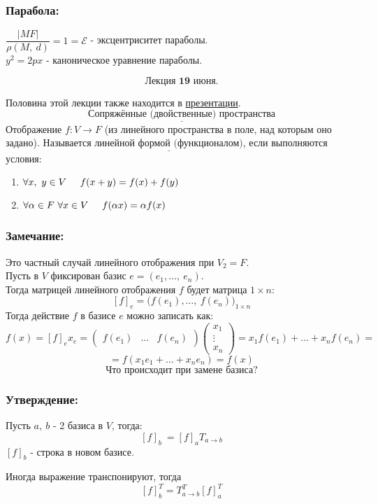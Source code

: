 \documentclass[12pt, letterpaper, twoside]{article}
\newcommand{\Underl}[1]{$\underline{\text{#1}}$}
\begin{document}
    \subsubsection*{Парабола:}
    $\dfrac{|MF|}{\rho(M,\ d)} = 1 = \mathcal{E}$ - эксцентриситет параболы.\\
    $y^2 = 2px$ - каноническое уравнение параболы.

\[\textbf{Лекция 19 июня.}\]

    Половина этой лекции также находится в \href{https://idk_what_to_put_in_here}{презентации}.
\[\underline{\text{Сопряжённые (двойственные) пространства}}\]
    Отображение $f: V\longrightarrow F$ (из линейного пространства в поле, над которым оно задано). Называется \Underl{линейной формой (функционалом)}, если выполняются условия:
\begin{enumerate}
    \item $\forall x,\ y\in V \hspace{0.5cm} f(x + y) = f(x) + f(y)$
    \item $\forall \alpha \in F\ \forall x\in V\hspace{0.5cm} f(\alpha x) = \alpha f(x)$
\end{enumerate}
\subsubsection*{Замечание:}
    Это частный случай линейного отображения при $V_2 = F$.\\
    Пусть в $V$ фиксирован базис $e = (e_1,\dots,\ e_n)$.\\
    Тогда матрицей линейного отображения $f$ будет матрица $1\times n$:
\[ [f]_e = \big( f(e_1),\dots,\ f(e_n) \big)_{1\times n}\]
    Тогда действие $f$ в базисе $e$ можно записать как:
\[f(x) = [f]_e x_e = \begin{pmatrix}
    f(e_1) & \dots & f(e_n)
\end{pmatrix}\begin{pmatrix}
    x_1\\
    \vdots\\
    x_n
\end{pmatrix} = x_1 f(e_1) + \dots + x_n f(e_n) =\]
\[=f(x_1 e_1 + \dots + x_n e_n) = f(x)\]
\[\text{Что происходит при замене базиса?}\]
\subsubsection*{Утверждение:}
    Пусть $a,\ b$ - 2 базиса в $V$, тогда:
\[[f]_b\ = [f]_a T_{a\to b}\]
$[f]_b$ - строка в новом базисе.\par
    Иногда выражение транспонируют, тогда
\[[f]_b^T = T^T_{a\to b} [f]^T_a\]
\end{document}
